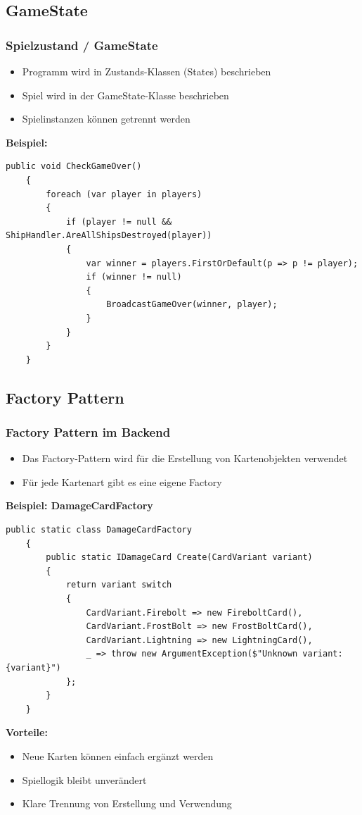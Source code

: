 \documentclass{beamer}
\begin{document}
\subsection{GameState}
\begin{frame}[fragile]
  \frametitle{Spielzustand / GameState}
  \begin{itemize}
    \item Programm wird in Zustands-Klassen (States) beschrieben
    \item Spiel wird in der GameState-Klasse beschrieben
    \item Spielinstanzen können getrennt werden
  \end{itemize}
  \textbf{Beispiel: }
  \begin{lstlisting}[language=CSharp, basicstyle=\ttfamily\tiny, breaklines=true]
    public void CheckGameOver()
    {
        foreach (var player in players)
        {
            if (player != null && ShipHandler.AreAllShipsDestroyed(player))
            {
                var winner = players.FirstOrDefault(p => p != player);
                if (winner != null)
                {
                    BroadcastGameOver(winner, player);
                }
            }
        }
    }
  \end{lstlisting}
\end{frame}

\subsection{Factory Pattern}
\begin{frame}[fragile]
\frametitle{Factory Pattern im Backend}
  \begin{itemize}
    \item Das Factory-Pattern wird für die Erstellung von Kartenobjekten verwendet
    \item Für jede Kartenart gibt es eine eigene Factory
  \end{itemize}
  
  \textbf{Beispiel: DamageCardFactory}
  \begin{lstlisting}[language=CSharp, basicstyle=\ttfamily\tiny, breaklines=true]
    public static class DamageCardFactory 
    {
        public static IDamageCard Create(CardVariant variant) 
        {
            return variant switch 
            {
                CardVariant.Firebolt => new FireboltCard(),
                CardVariant.FrostBolt => new FrostBoltCard(),
                CardVariant.Lightning => new LightningCard(),
                _ => throw new ArgumentException($"Unknown variant: {variant}")
            };
        }
    }
  \end{lstlisting}
  
  \textbf{Vorteile:}
  \begin{itemize}
    \item Neue Karten können einfach ergänzt werden
    \item Spiellogik bleibt unverändert
    \item Klare Trennung von Erstellung und Verwendung
  \end{itemize}
\end{frame}
\end{document}
